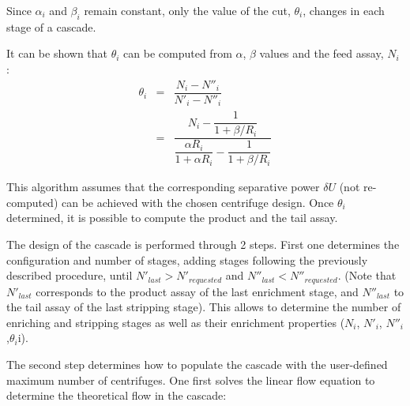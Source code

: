\documentclass{anstrans}
\begin{document}
Since $\alpha_{i}$ and $\beta_{i}$ remain constant, only the value of the cut,
$\theta_{i}$, changes in each stage of a cascade.

It can be shown that $\theta_{i}$ can be computed from $\alpha$,
$\beta$ values and the feed assay, $N_{i}$ \cite{ref}:
\begin{eqnarray}
    \theta_{i} &=& \dfrac{N_{i} - N''_{i}}{N'_{i}-N''_{i}}\nonumber\\
           &=& \dfrac{N_{i} - \dfrac{1}{1 + \beta/R_{i}}}{ \dfrac{\alpha R_{i}}{1 + \alpha R_{i}} -
           \dfrac{1}{1 + \beta/R_{i}}}
\end{eqnarray}

This algorithm assumes that the corresponding separative power $\delta U$ (not
re-computed) can be achieved with the chosen centrifuge design. Once
$\theta_{i}$ determined, it is possible to compute the product and the tail
assay.

The design of the cascade is performed through 2 steps. First one determines the
configuration and number of stages, adding stages following the previously
described procedure, until $N'_{last} > N'_{requested}$ and $N''_{last} <
N''_{requested}$. (Note that $N'_{last}$ corresponds to the product assay of the
last enrichment stage, and $N''_{last}$ to the tail assay of the last stripping
stage). This allows to determine the number of enriching and stripping stages as
well as their enrichment properties ($N_{i}$, $N'_{i}$,
$N''_{i}$,$\theta_{i}$i).

The second step determines how to populate the cascade with the user-defined
maximum number of centrifuges. One first solves the linear flow equation to
determine the theoretical flow in the cascade:
\end{document}
